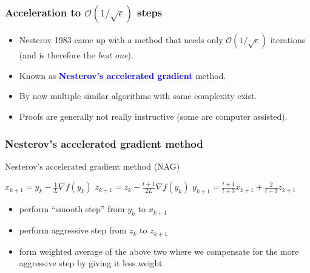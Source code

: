 \documentclass{beamer}
\begin{document}
\begin{frame}
  \frametitle{Acceleration to $\mathcal{O}(1/\sqrt{\epsilon})$ steps}

  \begin{itemize}
    \item Nesterov 1983 came up with a method that needs only $\mathcal{O}(1/\sqrt{\epsilon})$ iterations (and is therefore the \textit{best one}).
    \item Known as \textcolor{blue}{\textbf{Nesterov's accelerated gradient}} method.
    \item By now multiple similar algorithms with same complexity exist.
    \item Proofs are generally not really instructive (some are computer assisted).
  \end{itemize}

\end{frame}


\begin{frame}
  \frametitle{Nesterov's accelerated gradient method}
  \begin{algorithm}[H]
    \caption{Nesterov's accelerated gradient method (NAG)}
    \begin{algorithmic}[1]
      \State $x_{k+1} = y_k - \frac{1}{L} \nabla f(y_k)$
      \State $z_{k+1} = z_k - \frac{t+1}{2L} \nabla f(y_k)$
      \State $y_{k+1} = \frac{t+1}{t+3} x_{k+1} + \frac{2}{t+3} z_{k+1}$
      \EndFor
    \end{algorithmic}
  \end{algorithm}


  \begin{itemize}
    \item perform ``smooth step'' from $y_k$ to $x_{k+1}$
    \item perform aggressive step from $z_k$ to $z_{k+1}$
    \item form weighted average of the above two where we compensate for the more aggressive step by giving it less weight
  \end{itemize}

\end{frame}
\end{document}
